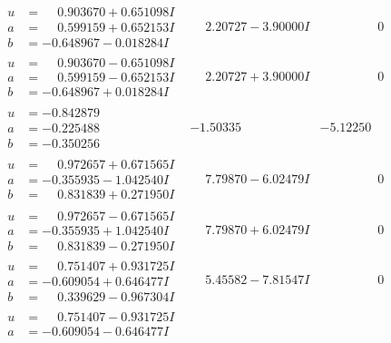 \documentclass[1p]{elsarticle_modified}
\theoremstyle{definition}
\begin{document}
$$\begin{array}{c|c|c}
\begin{aligned}
u &= \phantom{-}0.903670 + 0.651098 I \\
a &= \phantom{-}0.599159 + 0.652153 I \\
b &= -0.648967 - 0.018284 I\end{aligned}
 & \phantom{-}2.20727 - 3.90000 I & \phantom{-0.000000 } 0 \\ \hline\begin{aligned}
u &= \phantom{-}0.903670 - 0.651098 I \\
a &= \phantom{-}0.599159 - 0.652153 I \\
b &= -0.648967 + 0.018284 I\end{aligned}
 & \phantom{-}2.20727 + 3.90000 I & \phantom{-0.000000 } 0 \\ \hline\begin{aligned}
u &= -0.842879\phantom{ +0.000000I} \\
a &= -0.225488\phantom{ +0.000000I} \\
b &= -0.350256\phantom{ +0.000000I}\end{aligned}
 & -1.50335\phantom{ +0.000000I} & -5.12250\phantom{ +0.000000I} \\ \hline\begin{aligned}
u &= \phantom{-}0.972657 + 0.671565 I \\
a &= -0.355935 - 1.042540 I \\
b &= \phantom{-}0.831839 + 0.271950 I\end{aligned}
 & \phantom{-}7.79870 - 6.02479 I & \phantom{-0.000000 } 0 \\ \hline\begin{aligned}
u &= \phantom{-}0.972657 - 0.671565 I \\
a &= -0.355935 + 1.042540 I \\
b &= \phantom{-}0.831839 - 0.271950 I\end{aligned}
 & \phantom{-}7.79870 + 6.02479 I & \phantom{-0.000000 } 0 \\ \hline\begin{aligned}
u &= \phantom{-}0.751407 + 0.931725 I \\
a &= -0.609054 + 0.646477 I \\
b &= \phantom{-}0.339629 - 0.967304 I\end{aligned}
 & \phantom{-}5.45582 - 7.81547 I & \phantom{-0.000000 } 0 \\ \hline\begin{aligned}
u &= \phantom{-}0.751407 - 0.931725 I \\
a &= -0.609054 - 0.646477 I \\

\end{aligned}
\end{array}$$
\end{document}
